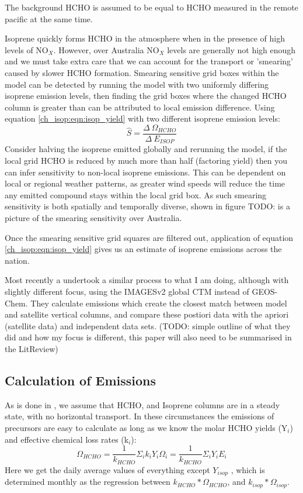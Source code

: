     The background HCHO is assumed to be equal to HCHO measured in the remote pacific at the same time.
    
    Isoprene quickly forms HCHO in the atmosphere when in the presence of high levels of NO$_X$.
    However, over Australia NO$_X$ levels are generally not high enough and we must take extra care that we can account for the transport or 'smearing' caused by slower HCHO formation.
    Smearing sensitive grid boxes within the model can be detected by running the model with two uniformly differing isoprene emission levels, then finding the grid boxes where the changed HCHO column is greater than can be attributed to local emission difference.
    Using equation \ref{ch_isop:eqn:isop_yield} with two different isoprene emission levels:
    \begin{equation*}
      \hat{S} = \frac{\Delta~\Omega_{HCHO}}{\Delta~E_{ISOP}}
    \end{equation*}
    Consider halving the isoprene emitted globally and rerunning the model, if the local grid HCHO is reduced by much more than half (factoring yield) then you can infer sensitivity to non-local isoprene emissions.
    This can be dependent on local or regional weather patterns, as greater wind speeds will reduce the time any emitted compound stays within the local grid box.
    As such smearing sensitivity is both spatially and temporally diverse, shown in figure TODO: is a picture of the smearing sensitivity over Australia.
   
    Once the smearing sensitive grid squares are filtered out, application of equation \ref{ch_isop:eqn:isop_yield} gives us an estimate of isoprene emissions across the nation.
    
    Most recently a \citet{Bauwens2016} undertook a similar process to what I am doing, although with slightly different focus, using the IMAGESv2 global CTM instead of GEOS-Chem.
    They calculate emissions which create the closest match between model and satellite vertical columns, and compare these postiori data with the apriori (satellite data) and independent data sets.
    (TODO: simple outline of what they did and how my focus is different, this paper will also need to be summarised in the LitReview)
    
  \subsection{Calculation of Emissions}
    \label{ch_isop:sec:EmissionCalculation}
    As is done in \citet{Palmer2003, Millet2006, Bauwens2016}, we assume that HCHO, and Isoprene columns are in a steady state, with no horizontal transport.
    In these circumstances the emissions of precursors are easy to calculate as long as we know the molar HCHO yields (Y$_i$) and effective chemical loss rates (k$_i$):
    \begin{equation}
      \Omega_{HCHO} = \frac{1}{k_{HCHO}}\Sigma_i k_i Y_i \Omega_i = \frac{1}{k_{HCHO}}\Sigma_i Y_i E_i
    \end{equation}
    Here we get the daily average values of everything except $Y_{isop}$ , which is determined monthly as the regression between $k_{HCHO}*\Omega_{HCHO}$, and $k_{isop}*\Omega_{isop}$.
    
